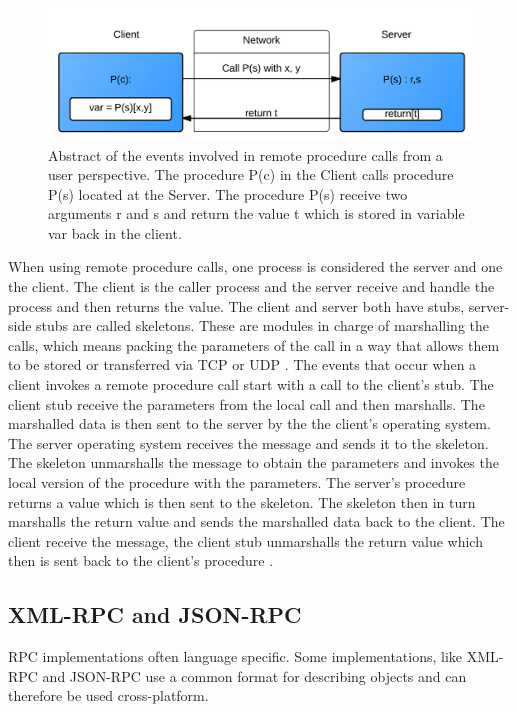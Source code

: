 \begin{figure}[H]
	\centering
    	\includegraphics[scale=0.25]{part_2/remote_procedure_calls/rpc.png}
		\caption{Abstract of the events involved in remote procedure calls from a user perspective.
The procedure P(c) in the Client calls procedure P(s) located at the Server. The procedure P(s) receive two arguments r and s and return the value t which is stored in variable var back in the client.}
		\label{rpc} 
\end{figure}

When using remote procedure calls, one process is considered the server and one the client. The client is the caller process and the server receive and handle the process and then returns the value. The client and server both have stubs, server-side stubs are called skeletons. These are modules in charge of marshalling the calls, which means packing the parameters of the call in a way that allows them to be stored or transferred via TCP or UDP \cite{rfc5531}. 
The events that occur when a client invokes a remote procedure call start with a call to the client's stub. The client stub receive the parameters from the local call and then marshalls. The marshalled data is then sent to the server by the the client's operating system. The server operating system receives the message and sends it to the skeleton. The skeleton unmarshalls the message  to obtain the parameters and invokes the local version of the procedure with the parameters. The server's procedure returns a value which is then sent to the skeleton. The skeleton then in turn marshalls the return value and sends the marshalled data back to the client. The client receive the message, the client stub unmarshalls the return value which then is sent back to the client's procedure \cite{Lewandowski97interprocesscommunication}.

\subsection{XML-RPC and JSON-RPC}
RPC implementations often language specific. Some implementations, like XML-RPC and JSON-RPC use a common format for describing objects and can therefore be used cross-platform.

